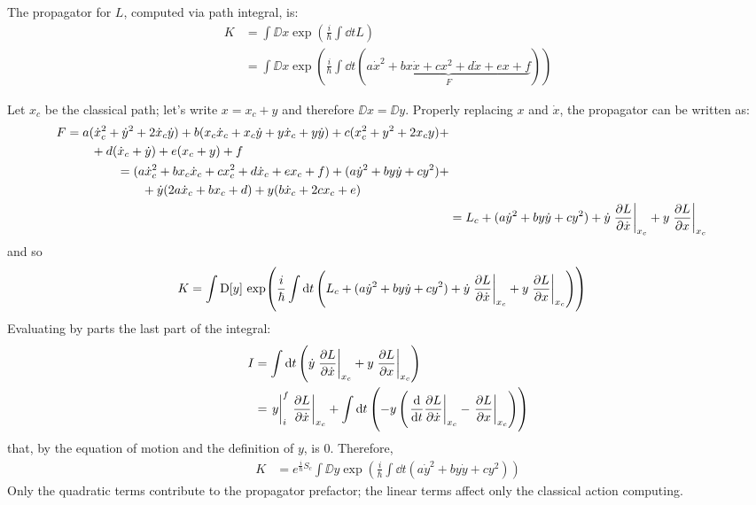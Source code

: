 \documentclass[main.tex]{subfiles}
\begin{document}
The propagator for $L$, computed via path integral, is:
\begin{align}
K &= \int\DD{x} \exp(\frac{i}{\hbar}\int \dd{t} L) \\
&= \int\DD{x} \exp(\frac{i}{\hbar}\int \dd{t} ( \underbrace{a\dot{x}^2 + bx\dot{x} + cx^2 + d\dot{x} + ex + f}_F) )
\end{align}

Let $x_c$ be the classical path; let's write $x = x_c + y$ and therefore $\DD{x} = \DD{y}$. Properly replacing $x$ and $\dot{x}$, the propagator can be written as:
\begin{align}
\begin{split}
F &= a (\dot{x}_c^2+\dot{y}^2+2\dot{x}_c\dot{y}) + b(x_c\dot{x}_c+x_c\dot{y}+y\dot{x}_c+y\dot{y}) + c(x_c^2+y^2+2x_cy) +\\&\qquad+ d(\dot{x}_c+\dot{y}) + e(x_c+y) + f
\end{split} \\
\begin{split}
&= (a\dot{x}_c^2+bx_c\dot{x}_c+cx_c^2+d\dot{x}_c+ex_c+f) + (a\dot{y}^2 + by\dot{y} + cy^2) + \\&\qquad + \dot{y} ( 2a\dot{x}_c + bx_c + d ) +y (b\dot{x}_c + 2cx_c + e) \end{split}\\
&= L_c + (a\dot{y}^2 + by\dot{y} + cy^2) + \dot{y} \eval{\pdv{L}{\dot{x}}}_{x_c} + y \eval{\pdv{L}{x}}_{x_c}
\end{align}
and so
\begin{align}
K &= \int\DD{y} \exp( \frac{i}{\hbar}\int \dd{t} \left( L_c + (a\dot{y}^2 + by\dot{y} + cy^2) + \dot{y} \eval{\pdv{L}{\dot{x}}}_{x_c} + y \eval{\pdv{L}{x}}_{x_c} \right) )
\end{align}
Evaluating by parts the last part of the integral:
\begin{align}
I &= \int \dd{t} \left( \dot{y} \eval{\pdv{L}{\dot{x}}}_{x_c} + y \eval{\pdv{L}{x}}_{x_c} \right) \\
&= \eval{y}_i^f \eval{\pdv{L}{\dot{x}}}_{x_c} + \int \dd{t} \left( -y \left( \eval{\dv{t}\pdv{L}{\dot{x}}}_{x_c} - \eval{\pdv{L}{x}}_{x_c} \right) \right)
\end{align}
that, by the equation of motion and the definition of $y$, is 0. Therefore,
\begin{align}
K &= e^{\frac{i}{\hbar} S_c }\int \DD{y} \exp( \frac{i}{\hbar} \int \dd{t} (a\dot{y}^2 + by\dot{y} + cy^2) )
\end{align}
Only the quadratic terms contribute to the propagator prefactor; the linear terms affect only the classical action computing.
\end{document}
